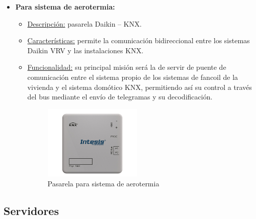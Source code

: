 \begin{itemize}
\item \textbf{Para sistema de aerotermia:} 
	\begin{itemize}
	\item\underline{Descripción:} pasarela Daikin – KNX.
	\item \underline{Características:} permite la comunicación bidireccional entre los sistemas Daikin VRV y las instalaciones KNX. 
	\item \underline{Funcionalidad:} su principal misión será la de servir de puente de comunicación entre el sistema propio de los sistemas de fancoil de la vivienda y el sistema domótico KNX, permitiendo así su control a través del bus mediante el envío de telegramas y su decodificación.
	\begin{figure}[H]
	\centering
	\includegraphics[width=0.47\textwidth]{figures/pasarela.png}   
	\caption{Pasarela para sistema de aerotermia}
	\label{fig:pasarela}
	\end{figure}
	\end{itemize} 
\end{itemize} 

\subsection{Servidores}

